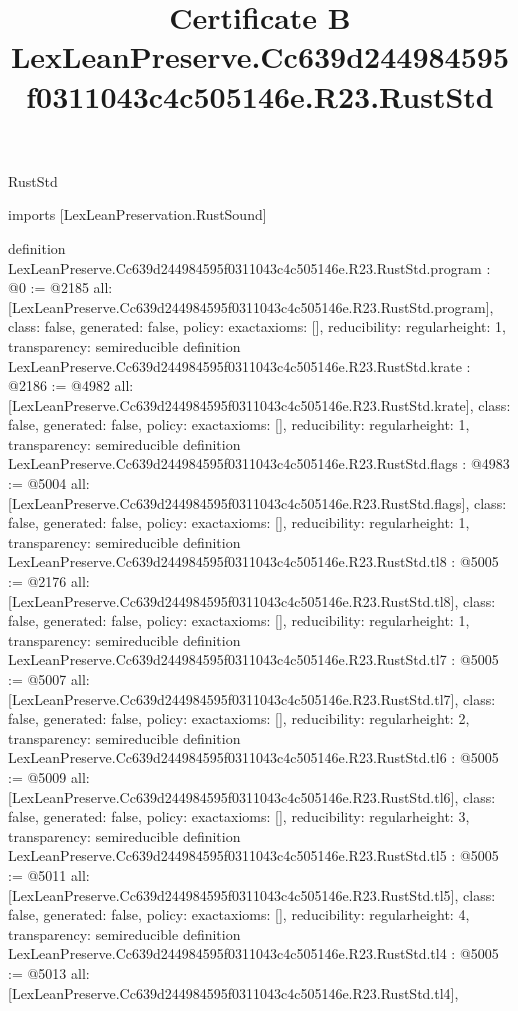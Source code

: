 \begin{lexlean}{RustStd}
\title{Certificate B LexLeanPreserve.Cc639d244984595f0311043c4c505146e.R23.RustStd}
\begin{coremodule}
imports [LexLeanPreservation.RustSound]

definition LexLeanPreserve.Cc639d244984595f0311043c4c505146e.R23.RustStd.program : @0 := @2185 {
  all: [LexLeanPreserve.Cc639d244984595f0311043c4c505146e.R23.RustStd.program],
  class: false,
  generated: false,
  policy: exact{axioms: []},
  reducibility: regular{height: 1},
  transparency: semireducible
}
definition LexLeanPreserve.Cc639d244984595f0311043c4c505146e.R23.RustStd.krate : @2186 := @4982 {
  all: [LexLeanPreserve.Cc639d244984595f0311043c4c505146e.R23.RustStd.krate],
  class: false,
  generated: false,
  policy: exact{axioms: []},
  reducibility: regular{height: 1},
  transparency: semireducible
}
definition LexLeanPreserve.Cc639d244984595f0311043c4c505146e.R23.RustStd.flags : @4983 := @5004 {
  all: [LexLeanPreserve.Cc639d244984595f0311043c4c505146e.R23.RustStd.flags],
  class: false,
  generated: false,
  policy: exact{axioms: []},
  reducibility: regular{height: 1},
  transparency: semireducible
}
definition LexLeanPreserve.Cc639d244984595f0311043c4c505146e.R23.RustStd.tl8 : @5005 := @2176 {
  all: [LexLeanPreserve.Cc639d244984595f0311043c4c505146e.R23.RustStd.tl8],
  class: false,
  generated: false,
  policy: exact{axioms: []},
  reducibility: regular{height: 1},
  transparency: semireducible
}
definition LexLeanPreserve.Cc639d244984595f0311043c4c505146e.R23.RustStd.tl7 : @5005 := @5007 {
  all: [LexLeanPreserve.Cc639d244984595f0311043c4c505146e.R23.RustStd.tl7],
  class: false,
  generated: false,
  policy: exact{axioms: []},
  reducibility: regular{height: 2},
  transparency: semireducible
}
definition LexLeanPreserve.Cc639d244984595f0311043c4c505146e.R23.RustStd.tl6 : @5005 := @5009 {
  all: [LexLeanPreserve.Cc639d244984595f0311043c4c505146e.R23.RustStd.tl6],
  class: false,
  generated: false,
  policy: exact{axioms: []},
  reducibility: regular{height: 3},
  transparency: semireducible
}
definition LexLeanPreserve.Cc639d244984595f0311043c4c505146e.R23.RustStd.tl5 : @5005 := @5011 {
  all: [LexLeanPreserve.Cc639d244984595f0311043c4c505146e.R23.RustStd.tl5],
  class: false,
  generated: false,
  policy: exact{axioms: []},
  reducibility: regular{height: 4},
  transparency: semireducible
}
definition LexLeanPreserve.Cc639d244984595f0311043c4c505146e.R23.RustStd.tl4 : @5005 := @5013 {
  all: [LexLeanPreserve.Cc639d244984595f0311043c4c505146e.R23.RustStd.tl4],
}
\end{coremodule}
\end{lexlean}
